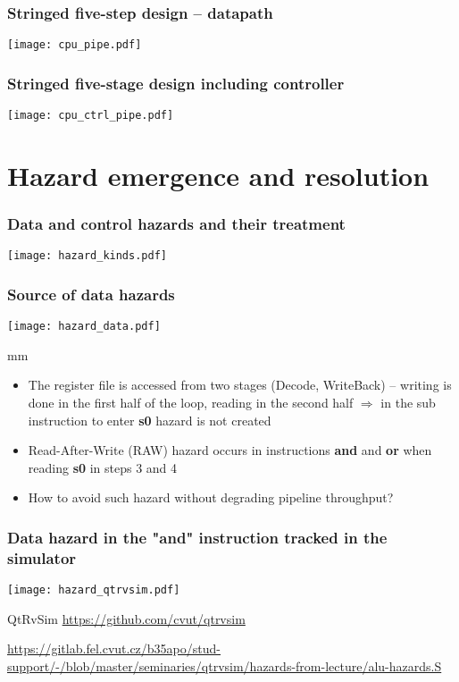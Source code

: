 \documentclass{beamer}
\begin{document}
\begin{frame}
\frametitle{Stringed five-step design -- datapath}
\texttt{[image: cpu\_pipe.pdf]}
\end{frame}

\begin{frame}
\frametitle{Stringed five-stage design including controller}
\texttt{[image: cpu\_ctrl\_pipe.pdf]}
\end{frame}

\section{Hazard emergence and resolution}

\begin{frame}
\frametitle{Data and control hazards and their treatment}
\texttt{[image: hazard\_kinds.pdf]}
\end{frame}

\begin{frame}
\frametitle{Source of data hazards}
\texttt{[image: hazard\_data.pdf]}

 mm

\begin{itemize}
 \item The register file is accessed from two stages (Decode, WriteBack) --
       writing is done in the first half of the loop, reading in the second half $\Rightarrow$ in the sub instruction to enter \textbf{s0} hazard is not created
 \item Read-After-Write (RAW) hazard occurs in instructions
       \textbf{and} and \textbf{or} when reading \textbf{s0} in steps 3 and 4
 \item How to avoid such hazard without degrading pipeline throughput?
\end{itemize}

\end{frame}


\begin{frame}
\frametitle{Data hazard in the "and" instruction tracked in the simulator}
\texttt{[image: hazard\_qtrvsim.pdf]}

{\tiny
QtRvSim \url{https://github.com/cvut/qtrvsim}
}

{\Tiny
\url{https://gitlab.fel.cvut.cz/b35apo/stud-support/-/blob/master/seminaries/qtrvsim/hazards-from-lecture/alu-hazards.S}
}

\end{frame}
\end{document}
